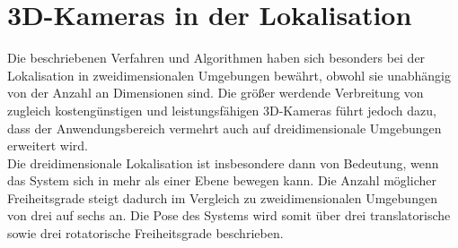 



\section{3D-Kameras in der Lokalisation}
Die beschriebenen Verfahren und Algorithmen haben sich besonders bei der Lokalisation in zweidimensionalen Umgebungen bewährt, obwohl sie unabhängig von der Anzahl an Dimensionen sind. Die größer werdende Verbreitung von zugleich kostengünstigen und leistungsfähigen 3D-Kameras%
führt jedoch dazu, dass der Anwendungsbereich vermehrt auch auf dreidimensionale Umgebungen erweitert wird.\\
Die dreidimensionale Lokalisation ist insbesondere dann von Bedeutung, wenn das System sich in mehr als einer Ebene bewegen kann. Die Anzahl möglicher Freiheitsgrade steigt dadurch im Vergleich zu zweidimensionalen Umgebungen von drei auf sechs an. Die Pose des Systems wird somit über drei translatorische sowie drei rotatorische Freiheitsgrade beschrieben.\\


